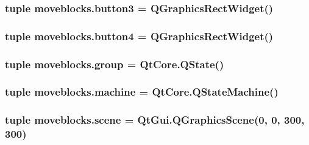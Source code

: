 \subsubsection[{button3}]{\setlength{\rightskip}{0pt plus 5cm}tuple moveblocks.\+button3 = {\bf Q\+Graphics\+Rect\+Widget}()}\label{namespacemoveblocks_ad3643cf235ebca9c5c3d358b61d0f357}
\hypertarget{namespacemoveblocks_af9c28d708b0133466b315980aa509e71}{}
\subsubsection[{button4}]{\setlength{\rightskip}{0pt plus 5cm}tuple moveblocks.\+button4 = {\bf Q\+Graphics\+Rect\+Widget}()}\label{namespacemoveblocks_af9c28d708b0133466b315980aa509e71}
\hypertarget{namespacemoveblocks_adbb5c3be2682eee3dda104f857c69d27}{}
\subsubsection[{group}]{\setlength{\rightskip}{0pt plus 5cm}tuple moveblocks.\+group = Qt\+Core.\+Q\+State()}\label{namespacemoveblocks_adbb5c3be2682eee3dda104f857c69d27}
\hypertarget{namespacemoveblocks_a830418167a83dca9055e11b1eefd930a}{}
\subsubsection[{machine}]{\setlength{\rightskip}{0pt plus 5cm}tuple moveblocks.\+machine = Qt\+Core.\+Q\+State\+Machine()}\label{namespacemoveblocks_a830418167a83dca9055e11b1eefd930a}
\hypertarget{namespacemoveblocks_a928c97a3867a13d50c13d5a30b34579a}{}
\subsubsection[{scene}]{\setlength{\rightskip}{0pt plus 5cm}tuple moveblocks.\+scene = Qt\+Gui.\+Q\+Graphics\+Scene(0, 0, 300, 300)}\label{namespacemoveblocks_a928c97a3867a13d50c13d5a30b34579a}
\hypertarget{namespacemoveblocks_a8e1c834a71ba9250191429d31540ef86}{}
